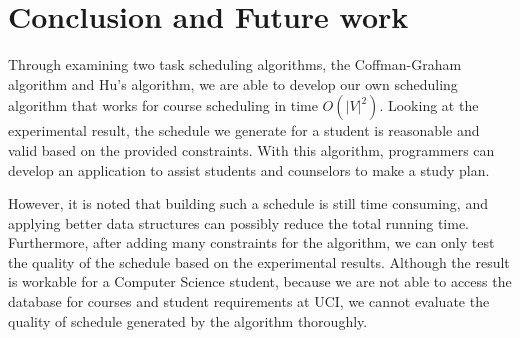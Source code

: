 \documentclass[letterpaper,12pt]{article}
\theoremstyle{definition}
\begin{document}
\section{Conclusion and Future work}
Through examining two task scheduling algorithms, the Coffman-Graham algorithm and Hu's algorithm, we are able to develop our own scheduling algorithm that works for course scheduling in time $O(|V|^2)$. Looking at the experimental result, the schedule we generate for a student is reasonable and valid based on the provided constraints. With this algorithm, programmers can develop an application to assist students and counselors to make a study plan. 

However, it is noted that building such a schedule is still time consuming, and applying better data structures can possibly reduce the total running time. Furthermore, after adding many constraints for the algorithm, we can only test the quality of the schedule based on the experimental results. Although the result is workable for a Computer Science student, because we are not able to access the database for courses and student requirements at UCI, we cannot evaluate the quality of schedule generated by the algorithm thoroughly.


\newpage


\end{document}
